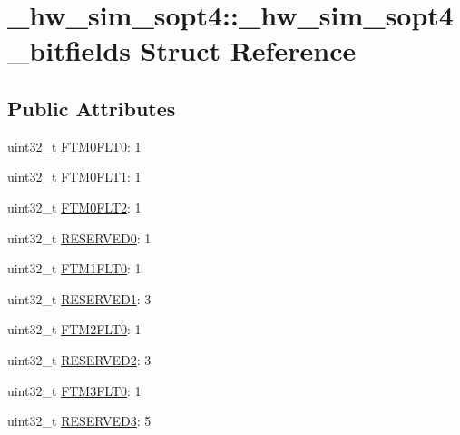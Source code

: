 \hypertarget{struct__hw__sim__sopt4_1_1__hw__sim__sopt4__bitfields}{}\section{\+\_\+hw\+\_\+sim\+\_\+sopt4\+:\+:\+\_\+hw\+\_\+sim\+\_\+sopt4\+\_\+bitfields Struct Reference}
\label{struct__hw__sim__sopt4_1_1__hw__sim__sopt4__bitfields}
\subsection*{Public Attributes}
\begin{DoxyCompactItemize}
\item 
uint32\+\_\+t \hyperlink{struct__hw__sim__sopt4_1_1__hw__sim__sopt4__bitfields_a8c8d321a135ab65c62a94c6c6fe895d2}{F\+T\+M0\+F\+L\+T0}\+: 1
\item 
uint32\+\_\+t \hyperlink{struct__hw__sim__sopt4_1_1__hw__sim__sopt4__bitfields_ab28daba01418363b4f0477ca042ab185}{F\+T\+M0\+F\+L\+T1}\+: 1
\item 
uint32\+\_\+t \hyperlink{struct__hw__sim__sopt4_1_1__hw__sim__sopt4__bitfields_ac89cdaa3211ee1224fd0a083569d51b9}{F\+T\+M0\+F\+L\+T2}\+: 1
\item 
uint32\+\_\+t \hyperlink{struct__hw__sim__sopt4_1_1__hw__sim__sopt4__bitfields_a4c98342aeb664ed28613c5d66144d3b4}{R\+E\+S\+E\+R\+V\+E\+D0}\+: 1
\item 
uint32\+\_\+t \hyperlink{struct__hw__sim__sopt4_1_1__hw__sim__sopt4__bitfields_a4216d609e1687a9b19fdc4c73ec41e93}{F\+T\+M1\+F\+L\+T0}\+: 1
\item 
uint32\+\_\+t \hyperlink{struct__hw__sim__sopt4_1_1__hw__sim__sopt4__bitfields_a38291aa8785de58094f3b09570b00fc9}{R\+E\+S\+E\+R\+V\+E\+D1}\+: 3
\item 
uint32\+\_\+t \hyperlink{struct__hw__sim__sopt4_1_1__hw__sim__sopt4__bitfields_a7bd771c9c7e8ed9dc7b104e52359b8e0}{F\+T\+M2\+F\+L\+T0}\+: 1
\item 
uint32\+\_\+t \hyperlink{struct__hw__sim__sopt4_1_1__hw__sim__sopt4__bitfields_a5ebfb44ffb8cc458c7249ce4775f407b}{R\+E\+S\+E\+R\+V\+E\+D2}\+: 3
\item 
uint32\+\_\+t \hyperlink{struct__hw__sim__sopt4_1_1__hw__sim__sopt4__bitfields_a6703a84008918d81604ebe28a8568f80}{F\+T\+M3\+F\+L\+T0}\+: 1
\item 
uint32\+\_\+t \hyperlink{struct__hw__sim__sopt4_1_1__hw__sim__sopt4__bitfields_ad9bc3eb2cbee2d04135d1d50d05652b6}{R\+E\+S\+E\+R\+V\+E\+D3}\+: 5

\end{DoxyCompactItemize}
